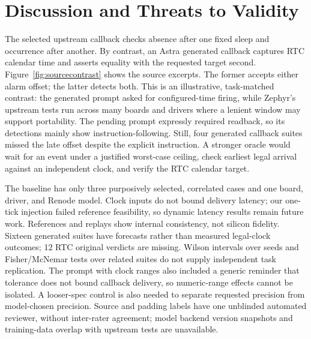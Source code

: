 \documentclass[sigconf,nonacm]{acmart}
\begin{document}
\section{Discussion and Threats to Validity}
The selected upstream callback checks absence after one fixed sleep and occurrence after another. By contrast, an Astra generated callback captures RTC calendar time and asserts equality with the requested target second. Figure~\ref{fig:sourcecontrast} shows the source excerpts. The former accepts either alarm offset; the latter detects both. This is an illustrative, task-matched contrast: the generated prompt asked for configured-time firing, while Zephyr's upstream tests run across many boards and drivers where a lenient window may support portability. The pending prompt expressly required readback, so its detections mainly show instruction-following. Still, four generated callback suites missed the late offset despite the explicit instruction. A stronger oracle would wait for an event under a justified worst-case ceiling, check earliest legal arrival against an independent clock, and verify the RTC calendar target.



The baseline has only three purposively selected, correlated cases and one board, driver, and Renode model. Clock inputs do not bound delivery latency; our one-tick injection failed reference feasibility, so dynamic latency results remain future work. References and replays show internal consistency, not silicon fidelity. Sixteen generated suites have forecasts rather than measured legal-clock outcomes; 12 RTC original verdicts are missing. Wilson intervals over seeds and Fisher/McNemar tests over related suites do not supply independent task replication. The prompt with clock ranges also included a generic reminder that tolerance does not bound callback delivery, so numeric-range effects cannot be isolated. A looser-spec control is also needed to separate requested precision from model-chosen precision. Source and padding labels have one unblinded automated reviewer, without inter-rater agreement; model backend version snapshots and training-data overlap with upstream tests are unavailable.
\end{document}
